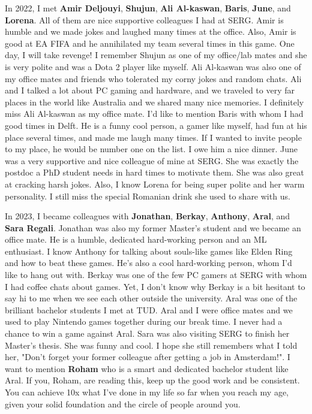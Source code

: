 In 2022, I met \textbf{Amir Deljouyi}, \textbf{Shujun}, \textbf{Ali Al-kaswan}, \textbf{Baris}, \textbf{June}, and \textbf{Lorena}. All of them are nice supportive colleagues I had at SERG. Amir is humble and we made jokes and laughed many times at the office. Also, Amir is good at EA FIFA and he annihilated my team several times in this game. One day, I will take revenge! I remember Shujun as one of my office/lab mates and she is very polite and was a Dota 2 player like myself. Ali Al-kaswan was also one of my office mates and friends who tolerated my corny jokes and random chats. Ali and I talked a lot about PC gaming and hardware, and we traveled to very far places in the world like Australia and we shared many nice memories. I definitely miss Ali Al-kaswan as my office mate. I'd like to mention Baris with whom I had good times in Delft. He is a funny cool person, a gamer like myself, had fun at his place several times, and made me laugh many times. If I wanted to invite people to my place, he would be number one on the list. I owe him a nice dinner. June was a very supportive and nice colleague of mine at SERG. She was exactly the postdoc a PhD student needs in hard times to motivate them. She was also great at cracking harsh jokes. Also, I know Lorena for being super polite and her warm personality. I still miss the special Romanian drink she used to share with us.

In 2023, I became colleagues with \textbf{Jonathan}, \textbf{Berkay}, \textbf{Anthony}, \textbf{Aral}, and \textbf{Sara Regali}. Jonathan was also my former Master's student and we became an office mate. He is a humble, dedicated hard-working person and an ML enthusiast. I know Anthony for talking about souls-like games like Elden Ring and how to beat these games. He's also a cool hard-working person, whom I'd like to hang out with. Berkay was one of the few PC gamers at SERG with whom I had coffee chats about games. Yet, I don't know why Berkay is a bit hesitant to say hi to me when we see each other outside the university. Aral was one of the brilliant bachelor students I met at TUD. Aral and I were office mates and we used to play Nintendo games together during our break time. I never had a chance to win a game against Aral. Sara was also visiting SERG to finish her Master's thesis. She was funny and cool. I hope she still remembers what I told her, "Don't forget your former colleague after getting a job in Amsterdam!". I want to mention \textbf{Roham} who is a smart and dedicated bachelor student like Aral. If you, Roham, are reading this, keep up the good work and be consistent. You can achieve 10x what I've done in my life so far when you reach my age, given your solid foundation and the circle of people around you. 


